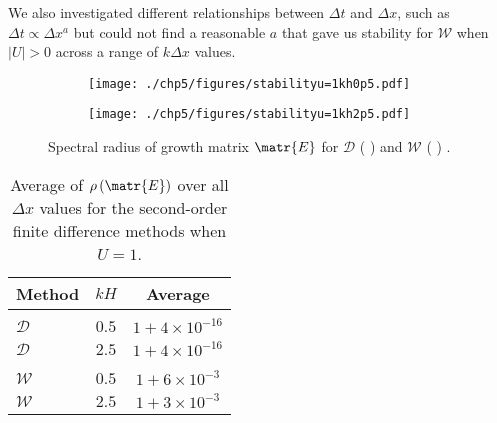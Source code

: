 We also investigated different relationships between $\Delta t$ and $\Delta x$, such as $\Delta t \propto \Delta x^a$ but could not find a reasonable $a$ that gave us stability for $\mathcal{W}$ when $|U| > 0$ across a range of $k\Delta x$ values.
\begin{figure}
	\centering
	\begin{subfigure}{0.5\textwidth}
		\texttt{[image: ./chp5/figures/stabilityu=1kh0p5.pdf]}
	\end{subfigure}%
	\begin{subfigure}{0.5\textwidth}
		\texttt{[image: ./chp5/figures/stabilityu=1kh2p5.pdf]}
	\end{subfigure}
	\caption{Spectral radius of growth matrix $\matr{E}$ for $\mathcal{D}$ ({\color{violet!80!white} \solidrule}) and $\mathcal{W}$ ({\color{orange} \solidrule}) .}
	\label{fig:Stabu=1}
\end{figure}


\begin{table}
	\centering
	\begin{tabular}{l  c  c}
		\hline
		Method & $kH$& Average\\
		\hline && \\
		$\mathcal{D}$ & $0.5$ & $1+ 4\times 10^{-16}$  \\
		$\mathcal{D}$ & $2.5$ & $1+ 4\times 10^{-16}$  \\
		\hline \\
		$\mathcal{W}$ & $0.5$ & $1+ 6\times 10^{-3}$  \\
		$\mathcal{W}$ & $2.5$ & $1+ 3\times 10^{-3}$   \\
		\hline
	\end{tabular}
	\caption{Average of $\rho\left(\matr{E}\right)$ over all $\Delta x$ values for the second-order finite difference methods when $U=1$.}
	\label{tab:Averageofspectralradiusu=1}
\end{table}